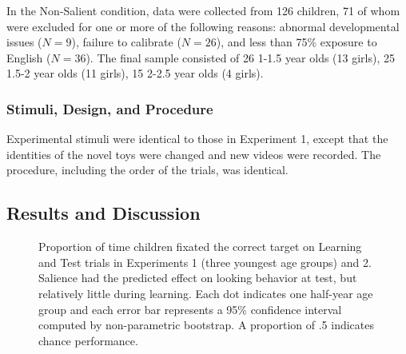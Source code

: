 \documentclass[man,floatsintext]{apa6}
\begin{document}
In the Non-Salient condition, data were collected from 126 children, 71 of whom were excluded for one or more of the following reasons: abnormal developmental issues ($N= 9$), failure to calibrate ($N=26$), and less than 75\% exposure to English ($N=36$). The final sample consisted of 26 1-1.5 year olds (13 girls), 25 1.5-2 year olds (11 girls), 15 2-2.5 year olds (4 girls).

\subsubsection{Stimuli, Design, and Procedure}

Experimental stimuli were identical to those in Experiment 1, except that the identities of the novel toys were changed and new videos were recorded. The procedure, including the order of the trials, was identical.

\subsection{Results and Discussion}

\begin{figure}[!h]
	\caption{\label{fig:exp1_2} Proportion of time children fixated the correct target on Learning and Test trials in Experiments 1 (three youngest age groups) and 2. Salience had the predicted effect on looking behavior at test, but relatively little during learning. Each dot indicates one half-year age group and each error bar represents a 95\% confidence interval computed by non-parametric bootstrap. A proportion of .5 indicates chance performance.}
\end{figure}
\end{document}
